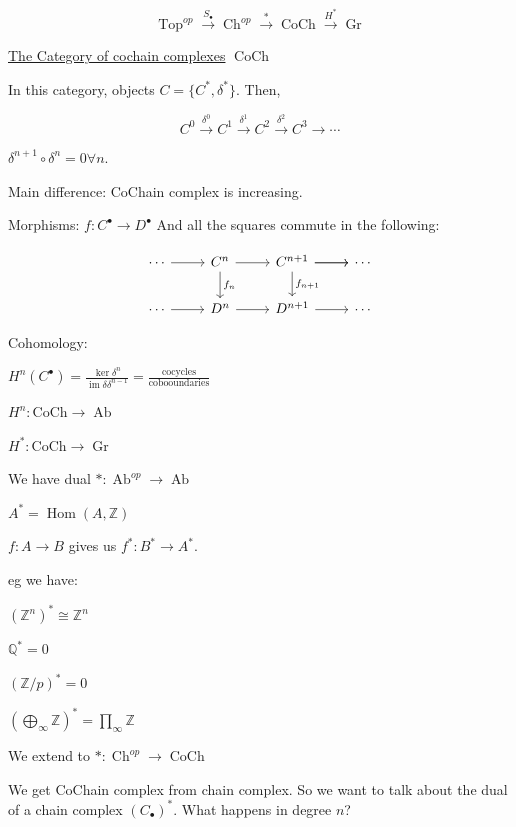 \documentclass{article}
\theoremstyle{definition}
\begin{document}
    \[
        \operatorname{Top}^{op} \xrightarrow{S_\bullet} \operatorname{Ch}^{op} \xrightarrow{\ast} \operatorname{CoCh} \xrightarrow{H^{\ast}} \operatorname{Gr} 
    \]

    \underline{The Category of cochain complexes} \(\operatorname{CoCh}\)

    In this category, objects \(C = \{ C^{\ast}, \delta^{\ast}\} \). Then,

    \[
        C^0 \xrightarrow{\delta^0} C^1 \xrightarrow{\delta^1} C^2 \xrightarrow{\delta^2} C^3 \to \cdots 
    \]

    \(\delta^{n+1} \circ \delta^n = 0 \forall n\).

    Main difference: CoChain complex is increasing.

    Morphisms: \(f: C^\bullet \to D^\bullet\) And all the squares commute in the following:

    \[
        \begin{tikzcd}
                \cdots \ar[r] & C^n \ar[r] \ar[d,"f_n"] & C^{n+1} \ar[r] \ar[d,"f_{n+1}"] \ar[r] & \cdots \\ \cdots \ar[r] & D^n \ar[r] & D^{n+1} \ar[r] & \cdots
        \end{tikzcd}
    \]

    Cohomology:

    \(H^n(C^\bullet) = \frac{\ker \delta^n}{\operatorname{im} \delta \delta^{n-1}} = \frac{\text{cocycles}}{\text{cobooundaries}}\) 

    \(H^n: \text{CoCh} \to \operatorname{Ab}\)
    
    \(H^{\ast} : \text{CoCh} \to \operatorname{Gr}\)

    We have dual \(\ast : \operatorname{Ab}^{op} \to \operatorname{Ab}\)

    \(A^{\ast} = \operatorname{Hom}(A,\mathbb{Z})\)

    \(f: A \to B\) gives us \(f^{\ast}: B^{\ast} \to A^{\ast}\).

    eg we have:

    \((\mathbb{Z}^n)^{\ast} \cong \mathbb{Z}^n\) 

    \(\mathbb{Q}^{\ast} = 0\) 

    \((\mathbb{Z} / p)^{\ast} = 0\) 

    \(\left( \bigoplus_{\infty} \mathbb{Z} \right)^{\ast} = \prod_{\infty} \mathbb{Z} \) 

    We extend to \(\ast: \operatorname{Ch}^{op} \to \operatorname{CoCh}\)

    We get CoChain complex from chain complex. So we want to talk about the dual of a chain complex \((C_\bullet)^{\ast}\). What happens in degree \(n\)?
\end{document}
